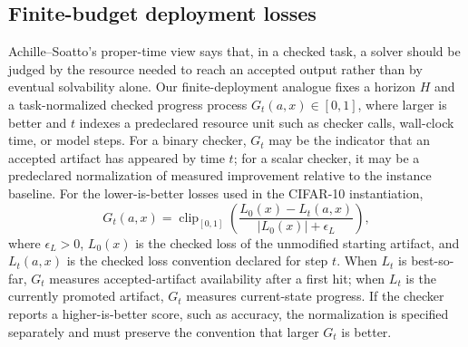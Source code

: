 \documentclass{article}
\begin{document}
\subsection{Finite-budget deployment losses}

Achille--Soatto's proper-time view says that, in a checked task, a solver should be judged by the resource needed to reach an accepted output rather than by eventual solvability alone.
Our finite-deployment analogue fixes a horizon $H$ and a task-normalized checked progress process $G_t(a,x)\in[0,1]$, where larger is better and $t$ indexes a predeclared resource unit such as checker calls, wall-clock time, or model steps.
For a binary checker, $G_t$ may be the indicator that an accepted artifact has appeared by time $t$; for a scalar checker, it may be a predeclared normalization of measured improvement relative to the instance baseline.
For the lower-is-better losses used in the CIFAR-10 instantiation,
\[
G_t(a,x)
=
\operatorname{clip}_{[0,1]}\!\left(
\frac{L_0(x)-L_t(a,x)}{|L_0(x)|+\epsilon_L}
\right),
\]
where $\epsilon_L>0$, $L_0(x)$ is the checked loss of the unmodified starting artifact, and $L_t(a,x)$ is the checked loss convention declared for step $t$.
When $L_t$ is best-so-far, $G_t$ measures accepted-artifact availability after a first hit; when $L_t$ is the currently promoted artifact, $G_t$ measures current-state progress.
If the checker reports a higher-is-better score, such as accuracy, the normalization is specified separately and must preserve the convention that larger $G_t$ is better.
\end{document}
